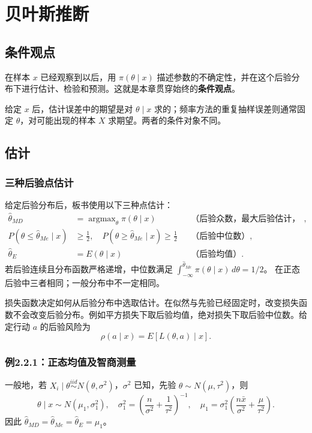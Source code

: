 \chapter{贝叶斯推断}

\section{条件观点}
在样本 $x$ 已经观察到以后，用 $\pi(\theta\mid x)$ 描述参数的不确定性，并在这个后验分布下进行估计、检验和预测。这就是本章贯穿始终的\textbf{条件观点}。

给定 $x$ 后，估计误差中的期望是对 $\theta\mid x$ 求的；频率方法的重复抽样误差则通常固定 $\theta$，对可能出现的样本 $X$ 求期望。两者的条件对象不同。

\section{估计}
\subsection{三种后验点估计}
给定后验分布后，板书使用以下三种点估计：
\begin{align*}
\hat\theta_{MD}&=\mathop{\arg\max}_{\theta}\pi(\theta\mid x)
&&\text{（后验众数，最大后验估计，MAP）},\\
P(\theta\leq\hat\theta_{Me}\mid x)&\geq\tfrac12,\quad
P(\theta\geq\hat\theta_{Me}\mid x)\geq\tfrac12
&&\text{（后验中位数）},\\
\hat\theta_E&=E(\theta\mid x)
&&\text{（后验均值）}.
\end{align*}
若后验连续且分布函数严格递增，中位数满足
$\int_{-\infty}^{\hat\theta_{Me}}\pi(\theta\mid x)\,d\theta=1/2$。
在正态后验中三者相同；一般分布中不一定相同。

损失函数决定如何从后验分布中选取估计。在似然与先验已经固定时，改变损失函数不会改变后验分布。例如平方损失下取后验均值，绝对损失下取后验中位数。给定行动 $a$ 的后验风险为
\[
\rho(a\mid x)=E[L(\theta,a)\mid x].
\]

\subsection{例2.2.1：正态均值及智商测量}
一般地，若 $X_i\mid\theta\overset{iid}{\sim}N(\theta,\sigma^2)$，$\sigma^2$ 已知，先验 $\theta\sim N(\mu,\tau^2)$，则
\[
\theta\mid x\sim N(\mu_1,\sigma_1^2),\quad
\sigma_1^2=\left(\frac n{\sigma^2}+\frac1{\tau^2}\right)^{-1},\quad
\mu_1=\sigma_1^2\left(\frac{n\bar x}{\sigma^2}+\frac\mu{\tau^2}\right).
\]
因此 $\hat\theta_{MD}=\hat\theta_{Me}=\hat\theta_E=\mu_1$。

